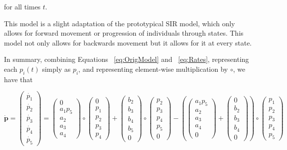 \documentclass[11pt]{amsart}
\begin{document}
for all times $t$.

This model is a slight adaptation of the prototypical SIR model, which only allows for forward movement or progression of individuals through states. This model not only allows for backwards movement but it allows for it at every state. 

In summary, combining Equations ~\ref{eq:OrigModel} and ~\ref{eq:Rates}, representing each $p_i(t)$ simply as $p_i$, and representing element-wise multiplication by $\circ$, we have that

\begin{equation}
    \boldsymbol{\dot{p}}
        =
    \begin{pmatrix} \dot{p_1} \\ \dot{p_2} \\ \dot{p_3} \\ \dot{p_4} \\ \dot{p_5} \end{pmatrix}
        =
    \begin{pmatrix} 0 \\ a_1 p_5 \\ a_2 \\ a_3 \\ a_4 \end{pmatrix} 
        \circ 
    \begin{pmatrix} 0 \\ p_1 \\ p_2 \\ p_3 \\ p_4 \end{pmatrix} 
        + 
    \begin{pmatrix} b_2 \\ b_3 \\ b_4 \\ b_5 \\ 0 \end{pmatrix} 
        \circ 
    \begin{pmatrix} p_2 \\ p_3 \\ p_4 \\ p_5 \\ 0 \end{pmatrix} 
        - 
    \left(\begin{pmatrix} a_1 p_5 \\ a_2 \\ a_3 \\ a_4 \\ 0 \end{pmatrix} + \begin{pmatrix} 0 \\ b_2 \\ b_3 \\ b_4 \\ 0 \end{pmatrix}\right) 
        \circ 
    \begin{pmatrix} p_1 \\ p_2 \\ p_3 \\ p_4 \\ p_5 \end{pmatrix}
\label{eq:VectorizedModel}
\end{equation}
\end{document}
